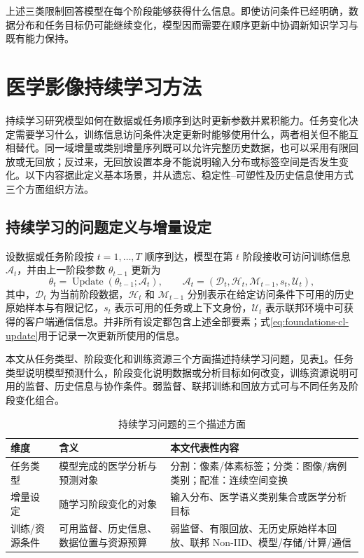 上述三类限制回答模型在每个阶段能够获得什么信息。即使访问条件已经明确，数据分布和任务目标仍可能继续变化，模型因而需要在顺序更新中协调新知识学习与既有能力保持。

\section{医学影像持续学习方法}
\label{sec:foundations-continual-learning}

持续学习研究模型如何在数据或任务顺序到达时更新参数并累积能力。任务变化决定需要学习什么，训练信息访问条件决定更新时能够使用什么，两者相关但不能互相替代。同一域增量或类别增量序列既可以允许完整历史数据，也可以采用有限回放或无回放；反过来，无回放设置本身不能说明输入分布或标签空间是否发生变化。以下内容据此定义基本场景，并从遗忘、稳定性--可塑性及历史信息使用方式三个方面组织方法。

\subsection{持续学习的问题定义与增量设定}
\label{subsec:foundations-cl-definition}

设数据或任务阶段按 $t=1,\ldots,T$ 顺序到达，模型在第 $t$ 阶段接收可访问训练信息 $\mathcal{A}_t$，并由上一阶段参数 $\theta_{t-1}$ 更新为
\begin{equation}
\theta_t
=
\operatorname{Update}
\!\left(
\theta_{t-1};
\mathcal{A}_t
\right),
\qquad
\mathcal{A}_t
=
\left(
\mathcal{D}_t,
\mathcal{H}_t,
\mathcal{M}_{t-1},
s_t,
\mathcal{U}_t
\right),
\label{eq:foundations-cl-update}
\end{equation}
其中，$\mathcal{D}_t$ 为当前阶段数据，$\mathcal{H}_t$ 和 $\mathcal{M}_{t-1}$ 分别表示在给定访问条件下可用的历史原始样本与有限记忆，$s_t$ 表示可用的任务或上下文身份，$\mathcal{U}_t$ 表示联邦环境中可获得的客户端通信信息。并非所有设定都包含上述全部要素；式\eqref{eq:foundations-cl-update}用于记录一次更新所使用的信息。

本文从任务类型、阶段变化和训练资源三个方面描述持续学习问题，见表\ref{tab:foundations-three-dimensions}。任务类型说明模型预测什么，阶段变化说明数据或分析目标如何改变，训练资源说明可用的监督、历史信息与协作条件。弱监督、联邦训练和回放方式可与不同任务及阶段变化组合。

\begin{table}[htbp]
\centering
\caption{持续学习问题的三个描述方面}
\label{tab:foundations-three-dimensions}
\thesistablefont
\setlength{\tabcolsep}{4pt}
\renewcommand{\arraystretch}{1.16}
\begin{tabularx}{\textwidth}{@{}p{2.1cm}Xp{5.0cm}@{}}
\toprule
维度 & 含义 & 本文代表性内容 \\
\midrule
任务类型 & 模型完成的医学分析与预测对象 & 分割：像素/体素标签；分类：图像/病例类别；配准：连续空间变换 \\
增量设定 & 随学习阶段变化的对象 & 输入分布、医学语义类别集合或医学分析目标 \\
训练/资源条件 & 可用监督、历史信息、数据位置与资源预算 & 弱监督、有限回放、无历史原始样本回放、联邦 Non-IID、模型/存储/计算/通信 \\
\bottomrule
\end{tabularx}
\end{table}

